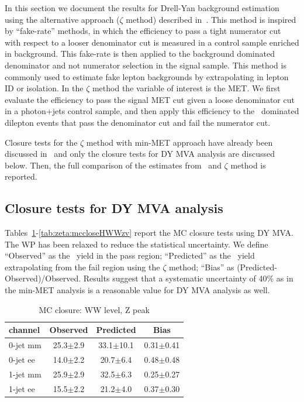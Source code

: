 In this section we document the results for Drell-Yan background estimation using the alternative approach ($\zeta$ method) described in~\cite{ZetaNote}.
This method is inspired by ``fake-rate'' methods, in which the efficiency to pass a tight numerator cut with respect to a looser denominator cut is measured 
in a control sample enriched in background.  This fake-rate is then applied to the background dominated denominator and not numerator selection in the signal sample.  
This method is commonly used to estimate fake lepton backgrounds by extrapolating in lepton ID or isolation.  
In the $\zeta$ method the variable of interest is the MET.  
We first evaluate the efficiency to pass the signal MET cut given a loose denominator cut in a photon+jets control sample, and then apply this 
efficiency to the \dyll\ dominated dilepton events that pass the denominator cut and fail the numerator cut.

Closure tests for the $\zeta$ method with min-MET approach have already been discussed in~\cite{ZetaNote} and only the closure tests for DY MVA analysis are discussed below.
Then, the full comparison of the estimates from \routin\ and $\zeta$ method is reported.

\subsection{Closure tests for DY MVA analysis}

Tables~\ref{tab:zeta:mccloseWWzp}-\ref{tab:zeta:mccloseHWWzv} report the MC closure tests using DY MVA. 
The WP has been relaxed to reduce the statistical uncertainty.
We define ``Observed'' as the \dyll\ yield in the pass region; ``Predicted'' as the \dyll\ yield extrapolating from the fail region using the $\zeta$ method;
``Bias'' as (Predicted-Observed)/Observed.
Results suggest that a systematic uncertainty of 40\% as in the min-MET analysis is a reasonable value for DY MVA analysis as well.

\begin{table}[!hbtp]
{
 \begin{center}
 \begin{tabular}{l | c c c}
 \hline
channel       & Observed & Predicted & Bias \\
 \hline
0-jet  mm &   25.3$\pm$2.9      &   33.1$\pm$10.1     &   0.31$\pm$0.41  \\
0-jet  ee &   14.0$\pm$2.2      &   20.7$\pm$6.4      &   0.48$\pm$0.48  \\
 \hline
1-jet  mm &   25.9$\pm$2.9      &   32.5$\pm$6.3      &   0.25$\pm$0.27  \\
1-jet  ee &   15.5$\pm$2.2      &   21.2$\pm$4.0      &   0.37$\pm$0.30  \\
 \hline
\end{tabular}
\end{center}
}
\caption{MC closure: WW level, Z peak}
\label{tab:zeta:mccloseWWzp}
\end{table}

